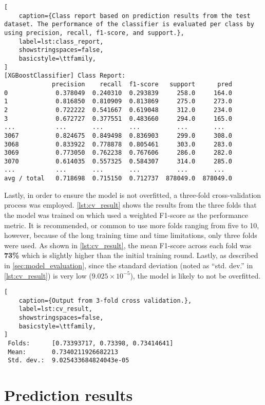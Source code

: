 \begin{lstlisting}[
    caption={Class report based on prediction results from the test dataset. The performance of the classifier is evaluated per class by using precision, recall, f1-score, and support.},
    label=lst:class_report,
    showstringspaces=false,
    basicstyle=\ttfamily,
]
[XGBoostClassifier] Class Report:
             precision    recall  f1-score   support      pred
0             0.378049  0.240310  0.293839     258.0     164.0
1             0.816850  0.810909  0.813869     275.0     273.0
2             0.722222  0.541667  0.619048     312.0     234.0
3             0.672727  0.377551  0.483660     294.0     165.0
...           ...       ...       ...          ...       ...
3067          0.824675  0.849498  0.836903     299.0     308.0
3068          0.833922  0.778878  0.805461     303.0     283.0
3069          0.773050  0.762238  0.767606     286.0     282.0
3070          0.614035  0.557325  0.584307     314.0     285.0
...           ...       ...       ...          ...       ...
avg / total   0.718698  0.715150  0.712737  878049.0  878049.0

\end{lstlisting}

Lastly, in order to ensure the model is not overfitted, a three-fold cross-validation process was employed. \cref{lst:cv_result} shows the results from the three folds that the model was trained on which used a weighted F1-score as the performance metric. It is recommended, or common to use more folds ranging from five to 10, however, because of the long training time and time limitations, only three folds were used. As shown in \cref{lst:cv_result}, the mean F1-score across each fold was \textbf{73\%} which is slightly higher than the initial training round. Lastly, as described in \cref{sec:model_evaluation}, since the standard deviation (noted as ``std. dev.'' in \cref{lst:cv_result}) is very low ($9.025 \times 10^{-5}$), the model is likely to not be overfitted.

\begin{lstlisting}[
    caption={Output from 3-fold cross validation.},
    label=lst:cv_result,
    showstringspaces=false,
    basicstyle=\ttfamily,
]
 Folds:      [0.73393717, 0.73398, 0.73414641]
 Mean:       0.7340211926682213
 Std. dev.:  9.025433684824043e-05
\end{lstlisting}

\section{Prediction results}

